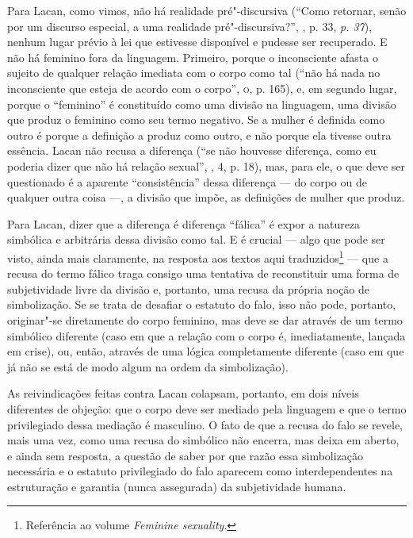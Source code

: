 Para Lacan, como vimos, não há realidade pré"-discursiva (``Como
retornar, senão por um discurso especial, a uma realidade
pré"-discursiva?'', , p. 33, \emph{p. 37}), nenhum lugar prévio à lei
que estivesse disponível e pudesse ser recuperado. E não há feminino
fora da linguagem. Primeiro, porque o inconsciente afasta o sujeito de
qualquer relação imediata com o corpo como tal (``não há nada no
inconsciente que esteja de acordo com o corpo'', \textsc{o}, p. 165), e, em
segundo lugar, porque o ``feminino'' é constituído como uma divisão na
linguagem, uma divisão que produz o feminino como seu termo negativo. Se
a mulher é definida como outro é porque a definição a produz como outro,
e não porque ela tivesse outra essência. Lacan não recusa a diferença
(``se não houvesse diferença, como eu poderia dizer que não há relação
sexual'', , 4, p. 18), mas, para ele, o que deve ser questionado é a %
aparente ``consistência'' dessa diferença --- do corpo ou de qualquer
outra coisa ---, a divisão que impõe, as definições de mulher que produz.

Para Lacan, dizer que a diferença é diferença ``fálica'' é expor a
natureza simbólica e arbitrária dessa divisão como tal. E é crucial ---
algo que pode ser visto, ainda mais claramente, na resposta aos textos
aqui traduzidos\footnote{Referência ao volume \emph{Feminine sexuality}.}
--- que a recusa do termo fálico traga consigo uma tentativa de
reconstituir uma forma de subjetividade livre da divisão e, portanto,
uma recusa da própria noção de simbolização. Se se trata de desafiar o
estatuto do falo, isso não pode, portanto, originar"-se diretamente do
corpo feminino, mas deve se dar através de um termo simbólico diferente
(caso em que a relação com o corpo é, imediatamente, lançada em crise),
ou, então, através de uma lógica completamente diferente (caso em que já
não se está de modo algum na ordem da simbolização).

As reivindicações feitas contra Lacan colapsam, portanto, em dois níveis
diferentes de objeção: que o corpo deve ser mediado pela linguagem e que
o termo privilegiado dessa mediação é masculino. O fato de que a recusa
do falo se revele, mais uma vez, como uma recusa do simbólico não
encerra, mas deixa em aberto, e ainda sem resposta, a questão de saber
por que razão essa simbolização necessária e o estatuto privilegiado do
falo aparecem como interdependentes na estruturação e garantia (nunca
assegurada) da subjetividade humana.


